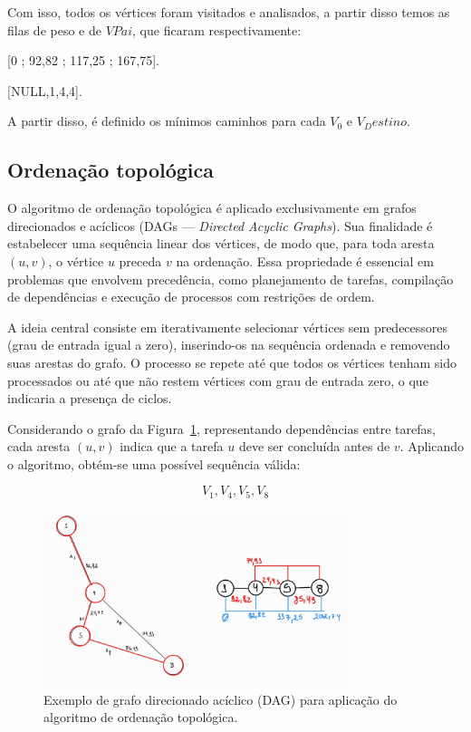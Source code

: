 Com isso, todos os vértices foram visitados e analisados, a partir disso temos as filas de peso e de $VPai$, que ficaram respectivamente:

[0 ; 92,82 ; 117,25 ; 167,75].

[NULL,1,4,4].

A partir disso, é definido os mínimos caminhos para cada $V_0$ e $V_Destino$.

\subsection{Ordenação topológica}\label{sec:ordTopologica}

O algoritmo de ordenação topológica é aplicado exclusivamente em grafos direcionados e acíclicos (DAGs — \textit{Directed Acyclic Graphs}). Sua finalidade é estabelecer uma sequência linear dos vértices, de modo que, para toda aresta $(u, v)$, o vértice $u$ preceda $v$ na ordenação. Essa propriedade é essencial em problemas que envolvem precedência, como planejamento de tarefas, compilação de dependências e execução de processos com restrições de ordem.

A ideia central consiste em iterativamente selecionar vértices sem predecessores (grau de entrada igual a zero), inserindo-os na sequência ordenada e removendo suas arestas do grafo. O processo se repete até que todos os vértices tenham sido processados ou até que não restem vértices com grau de entrada zero, o que indicaria a presença de ciclos.

Considerando o grafo da Figura~\ref{fig:ordTopologica}, representando dependências entre tarefas, cada aresta $(u,v)$ indica que a tarefa $u$ deve ser concluída antes de $v$. Aplicando o algoritmo, obtém-se uma possível sequência válida:

\[
V_1, V_4, V_5, V_8
\]

\begin{figure}[H]
    \centering
    \includegraphics[width=0.8\textwidth]{figuras/topologigi.jpeg}
    \caption{Exemplo de grafo direcionado acíclico (DAG) para aplicação do algoritmo de ordenação topológica.}
    \label{fig:ordTopologica}
\end{figure}

